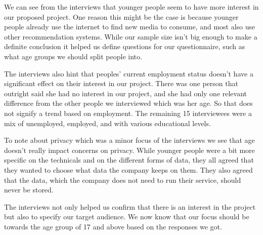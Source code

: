We can see from the interviews that younger people seem to have more interest in our proposed project. One reason this might be the case is because younger people already use the internet to find new media to consume, and most also use other recommendation systems. While our sample size isn’t big enough to make a definite conclusion it helped us define questions for our questionnaire, such as what age groups we should split people into. 

The interviews also hint that peoples’ current employment status doesn’t have a significant effect on their interest in our project. There was one person that outright said she had no interest in our project, and she had only one relevant difference from the other people we interviewed which was her age. So that does not signify a trend based on employment. The remaining 15 interviewees were a mix of unemployed, employed, and with various educational levels.

To note about privacy which was a minor focus of the interviews we see that age doesn’t really impact concerns on privacy. While younger people were a bit more specific on the technicals and on the different forms of data, they all agreed that they wanted to choose what data the company keeps on them. They also agreed that the data, which the company does not need to run their service, should never be stored.

The interviews not only helped us confirm that there is an interest in the project but also to specify our target audience. We now know that our focus should be towards the age group of 17 and above based on the responses we got.